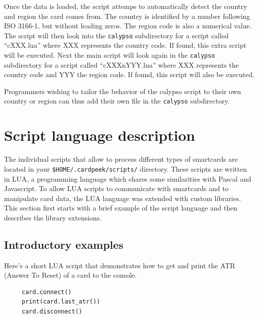\documentclass[11pt]{report}
\begin{document}
Once the data is loaded, the script attemps to automatically detect the country and 
region the card comes from.
The country is identified by a number following ISO 3166-1, but without leading zeros.
The region code is also a numerical value. 
The script will then look into the \texttt{calypso} subdirectory for a script called ``cXXX.lua'' where
XXX represents the country code. If found, this extra script will be executed. Next
the main script will look again in the \texttt{calypso} subdirectory for a script called 
``cXXXnYYY.lua'' where XXX represents the country code and YYY the region code.
If found, this script will also be executed.

Programmers wishing to tailor the behavior of the calypso script to their own
country or region can thus add their own file in the \texttt{calypso} subdirectory.

 

\chapter{Script language description}

The individual scripts that allow to process different types of smartcards are located in your 
\texttt{\$HOME/.cardpeek/scripts/} directory.
These scripts are written in LUA, a programming language which shares some similarities with Pascal and Javascript.
To allow LUA scripts to communicate with smartcards and to manipulate card data, the LUA language was extended with custom libraries.
This section first starts with a brief example of the script language and then describes the library extensions.

\section{Introductory examples}

Here's a short LUA script that demonstrates how to get and print the ATR (Answer To Reset) of a card to the console.

\begin{verbatim}
     card.connect()
     print(card.last_atr())
     card.disconnect()
\end{verbatim}
\end{document}
